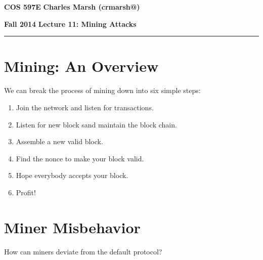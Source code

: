 \documentclass[12pt]{article}
\makeatletter
\newcommand{\myheader}[4]
{\vspace*{-0.5in}
\noindent
{#1} \hfill {#3}

\noindent
{#2} \hfill {#4}

\noindent
\rule[8pt]{\textwidth}{1pt}

\vspace{1ex} 
}  %
\newcommand{\myalgsheader}[0]
{\myheader
{ {\bf{COS 597E}} }
{ {\bf{Fall 2014}} }
{ {\bf{Charles Marsh (crmarsh@)}} }
{ {\bf{Lecture 11: Mining Attacks}} }
}
\makeatother
\begin{document}
\myalgsheader

\pagestyle{plain}

\section*{Mining: An Overview}

We can break the process of mining down into six simple steps:

\begin{enumerate}
\item Join the network and listen for transactions.
\item Listen for new block sand maintain the block chain.
\item Assemble a new valid block.
\item Find the nonce to make your block valid.
\item Hope everybody accepts your block.
\item Profit!
\end{enumerate}

\section*{Miner Misbehavior}

How can miners deviate from the default protocol?
\end{document}
